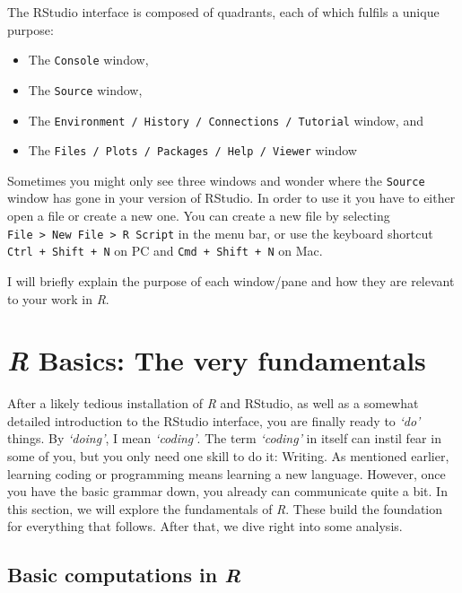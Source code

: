 \documentclass[
  letterpaper,
]{krantz}
\begin{document}
The RStudio interface is composed of quadrants, each of which fulfils a
unique purpose:

\begin{itemize}
\item
  The \texttt{Console} window,
\item
  The \texttt{Source} window,
\item
  The \texttt{Environment\ /\ History\ /\ Connections\ /\ Tutorial}
  window, and
\item
  The \texttt{Files\ /\ Plots\ /\ Packages\ /\ Help\ /\ Viewer} window
\end{itemize}

Sometimes you might only see three windows and wonder where the
\texttt{Source} window has gone in your version of RStudio. In order to
use it you have to either open a file or create a new one. You can
create a new file by selecting
\texttt{File\ \textgreater{}\ New\ File\ \textgreater{}\ R\ Script} in
the menu bar, or use the keyboard shortcut \texttt{Ctrl\ +\ Shift\ +\ N}
on PC and \texttt{Cmd\ +\ Shift\ +\ N} on Mac.

I will briefly explain the purpose of each window/pane and how they are
relevant to your work in \emph{R}.


\chapter{\texorpdfstring{\emph{R} Basics: The very
fundamentals}{R Basics: The very fundamentals}}\label{r-basics-the-very-fundamentals}

After a likely tedious installation of \emph{R} and RStudio, as well as
a somewhat detailed introduction to the RStudio interface, you are
finally ready to \emph{`do'} things. By \emph{`doing'}, I mean
\emph{`coding'}. The term \emph{`coding'} in itself can instil fear in
some of you, but you only need one skill to do it: Writing. As mentioned
earlier, learning coding or programming means learning a new language.
However, once you have the basic grammar down, you already can
communicate quite a bit. In this section, we will explore the
fundamentals of \emph{R}. These build the foundation for everything that
follows. After that, we dive right into some analysis.

\section{\texorpdfstring{Basic computations in
\emph{R}}{Basic computations in R}}\label{basic-computations-in-r}
\end{document}
